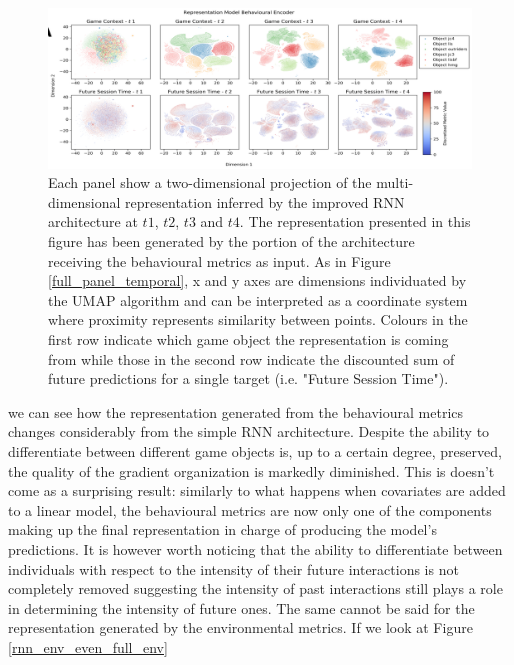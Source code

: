 \begin{figure}[ht]
\centering
\includegraphics[width=\textwidth]{images/chapter_4/rnn_full_beha_partial.png}
\caption[\textbf{Lower dimensional representation of the latent representations generated by the improved version of the RNN architecture from the behavioural metrics}]{Each panel show a two-dimensional projection of the multi-dimensional representation inferred by the improved RNN architecture at $t1$, $t2$, $t3$ and $t4$. The representation presented in this figure has been generated by the portion of the architecture receiving the behavioural metrics as input. As in Figure \ref{full_panel_temporal}, x and y axes are dimensions individuated by the UMAP algorithm and can be interpreted as a coordinate system where proximity represents similarity between points. Colours in the first row indicate which game object the representation is coming from while those in the second row indicate the discounted sum of future predictions for a single target (i.e. "Future Session Time").}
\label{rnn_env_even_full_beha}
\end{figure}

we can see how the representation generated from the behavioural metrics changes considerably from the simple RNN architecture. Despite the ability to differentiate between different game objects is, up to a certain degree, preserved, the quality of the gradient organization is markedly diminished. This is doesn't come as a surprising result: similarly to what happens when covariates are added to a linear model, the behavioural metrics are now only one of the components making up the final representation in charge of producing the model's predictions. It is however worth noticing that the ability to differentiate between individuals with respect to the intensity of their future interactions is not completely removed suggesting the intensity of past interactions still plays a role in determining the intensity of future ones. The same cannot be said for the representation generated by the environmental metrics. If we look at Figure \ref{rnn_env_even_full_env}

